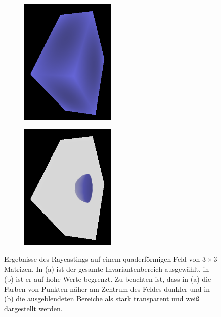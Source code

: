 \documentclass[a4paper,fontsize=12pt,toc=bib,halfparskip]{scrartcl}
\begin{document}
\begin{figure}
	\hspace*{\fill}
	\begin{subfigure}{0.49\textwidth}
		\centering
		\includegraphics[width=0.5\textwidth]{pictures/Raycasting1.png}
		\subcaption{}
		\label{RaycastingExample1}
	\end{subfigure}
	\hfill
	\begin{subfigure}{0.49\textwidth}
		\centering
		\includegraphics[width=0.5\textwidth]{pictures/Raycasting2.png}
		\subcaption{}
		\label{RaycastingExample2}
	\end{subfigure}
	\hspace*{\fill}
	\caption{Ergebnisse des Raycastings auf einem quaderf\"ormigen Feld von $3\times3$ Matrizen. In (a) ist der gesamte Invariantenbereich ausgew\"ahlt, in (b) ist er auf hohe Werte begrenzt. Zu beachten ist, dass in (a) die Farben von Punkten n\"aher am Zentrum des Feldes dunkler und in (b) die ausgeblendeten Bereiche als stark transparent und wei{\ss} dargestellt werden.}
	\label{RaycastingExample}
\end{figure}
\end{document}
